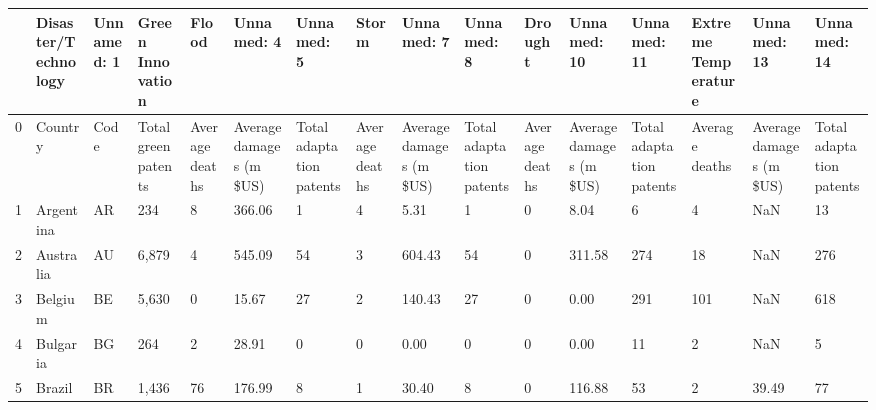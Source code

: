 \begin{tabular}{llllllllllllllll}
\toprule
{} & Disaster/Technology & Unnamed: 1 &     Green Innovation &           Flood &               Unnamed: 4 &                Unnamed: 5 &           Storm &               Unnamed: 7 &                Unnamed: 8 &         Drought &              Unnamed: 10 &               Unnamed: 11 & Extreme Temperature &              Unnamed: 13 &               Unnamed: 14 \\
\midrule
0  &             Country &       Code &  Total green patents &  Average deaths &  Average damages (m \$US) &  Total adaptation patents &  Average deaths &  Average damages (m \$US) &  Total adaptation patents &  Average deaths &  Average damages (m \$US) &  Total adaptation patents &      Average deaths &  Average damages (m \$US) &  Total adaptation patents \\
1  &          Argentina  &        AR  &                  234 &               8 &                   366.06 &                         1 &               4 &                     5.31 &                         1 &               0 &                     8.04 &                         6 &                   4 &                      NaN &                        13 \\
2  &          Australia  &        AU  &                6,879 &               4 &                   545.09 &                        54 &               3 &                   604.43 &                        54 &               0 &                   311.58 &                       274 &                  18 &                      NaN &                       276 \\
3  &            Belgium  &        BE  &                5,630 &               0 &                    15.67 &                        27 &               2 &                   140.43 &                        27 &               0 &                     0.00 &                       291 &                 101 &                      NaN &                       618 \\
4  &            Bulgaria &        BG  &                  264 &               2 &                    28.91 &                         0 &               0 &                     0.00 &                         0 &               0 &                     0.00 &                        11 &                   2 &                      NaN &                         5 \\
5  &              Brazil &        BR  &                1,436 &              76 &                   176.99 &                         8 &               1 &                    30.40 &                         8 &               0 &                   116.88 &                        53 &                   2 &                    39.49 &                        77 \\

\end{tabular}
